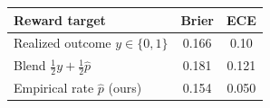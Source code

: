 \begin{tabular}{lcc}
\toprule
Reward target & Brier & ECE \\
\midrule
Realized outcome $y\in\{0,1\}$ & 0.166 & 0.10 \\
Blend $\tfrac{1}{2}y + \tfrac{1}{2}\hat{p}$ & 0.181 & 0.121 \\
Empirical rate $\hat{p}$ (ours) & 0.154 & 0.050 \\
\bottomrule
\end{tabular}
